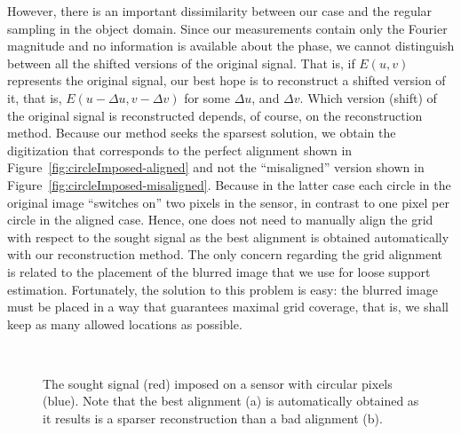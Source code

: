 However, there is an important dissimilarity between our case and the
regular sampling in the object domain. Since our measurements contain
only the Fourier magnitude and no information is available about the
phase, we cannot distinguish between all the shifted versions of the
original signal. That is, if $E(u,v)$ represents the original signal,
our best hope is to reconstruct a shifted version of it, that is,
$E(u-\Delta u, v-\Delta v)$ for some $\Delta u$, and $\Delta v$.
Which version (shift) of the original signal is reconstructed depends, of
course, on the reconstruction method. Because our method seeks the
sparsest solution, we obtain the digitization that corresponds to the perfect
alignment shown in Figure~\ref{fig:circleImposed-aligned} and not the
``misaligned'' version shown in
Figure~\ref{fig:circleImposed-misaligned}. Because in the latter case
each circle in the original image ``switches on'' two pixels in the
sensor, in contrast to one pixel per circle in the aligned case. Hence,
one does not need  to manually align the grid with respect to the sought
signal as the best alignment is obtained automatically with our
reconstruction method. The only concern regarding the grid alignment
is related to the placement of the blurred image that we use for loose
support estimation. Fortunately, the solution to this problem is easy:
the blurred image must be placed in a way that guarantees maximal grid
coverage, that is, we shall keep as many allowed locations as
possible.

\begin{figure}[H]
  \centering
  \\
  \caption[The sought signal imposed on a sensor with circular
    pixels]{The sought signal (red) imposed on a sensor with circular
    pixels (blue). Note that the best alignment (a) is automatically
    obtained as it results is a sparser reconstruction than a bad
    alignment (b).}
  \label{fig:cirle-imposed}
\end{figure}

